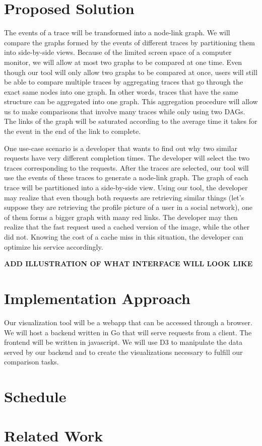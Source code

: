 \documentclass{article}
\begin{document}
\section{Proposed Solution}

The events of a trace will be transformed into a node-link graph. We will compare the graphs formed by the events of different traces
by partitioning them into side-by-side views. Because of the limited screen space of a computer monitor, we will allow at most two
graphs to be compared at one time. Even though our tool will only allow two graphs to be compared at once, users will still be able
to compare multiple traces by aggregating traces that go through the exact same nodes into one graph. In other words, traces that have
the same structure can be aggregated into one graph. This aggregation procedure will allow us to make comparisons that involve many
traces while only using two DAGs. The links of the graph will be saturated according to the average time it takes for the event in
the end of the link to complete.

One use-case scenario is a developer that wants to find out why two similar requests have very different completion times. The developer
will select the two traces corresponding to the requests. After the traces are selected, our tool will use the events of these traces
to generate a node-link graph. The graph of each trace will be partitioned into a side-by-side view. Using our tool, the developer may
realize that even though both requests are retrieving similar things (let's suppose they are retrieving the profile picture of a user in 
a social network), one of them forms a bigger graph with many red links. The developer may then realize that the fast request used a cached
version of the image, while the other did not. Knowing the cost of a cache miss in this situation, the developer can optimize his service
accordingly. 

\textbf{ADD ILLUSTRATION OF WHAT INTERFACE WILL LOOK LIKE}

\section{Implementation Approach}

Our visualization tool will be a webapp that can be accessed through a browser. We will host a backend written in Go that 
will serve requests from a client. The frontend will be written in javascript. We will use D3 to manipulate the data served
by our backend and to create the visualizations necessary to fulfill our comparison tasks.

\section{Schedule}

\section{Related Work}
\end{document}
